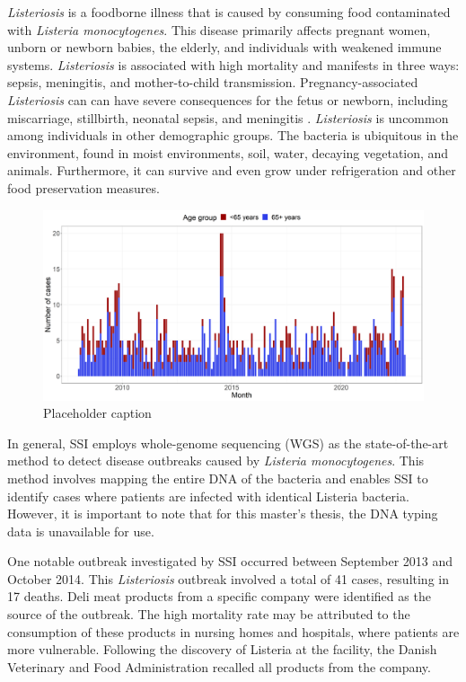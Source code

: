 \documentclass[a4paper,twoside,11pt]{report} %
\theoremstyle{definition}
\theoremstyle{definition}
\theoremstyle{definition}
\theoremstyle{definition}
\theoremstyle{remark}
\begin{document}
\textit{Listeriosis} is a foodborne illness that is caused by consuming food contaminated with \textit{Listeria monocytogenes}. This disease primarily affects pregnant women, unborn or newborn babies, the elderly, and individuals with weakened immune systems. \textit{Listeriosis} is associated with high mortality \autocite{Goulet_2012} and manifests in three ways: sepsis, meningitis, and mother-to-child transmission. Pregnancy-associated \textit{Listeriosis} can can have severe consequences for the fetus or newborn, including miscarriage, stillbirth, neonatal sepsis, and meningitis \autocite{Awofisayo_2015}. \textit{Listeriosis} is uncommon among individuals in other demographic groups. The bacteria is ubiquitous in the environment, found in moist environments, soil, water, decaying vegetation, and animals. Furthermore, it can survive and even grow under refrigeration and other food preservation measures.



\begin{figure}[H]
\includegraphics[width=1\linewidth]{../figures/LIST_long_plot} \caption{Placeholder caption}\label{fig:LISTLongPlot}
\end{figure}

In general, SSI employs whole-genome sequencing (WGS) as the state-of-the-art method to detect disease outbreaks caused by \textit{Listeria monocytogenes}. This method involves mapping the entire DNA of the bacteria and enables SSI to identify cases where patients are infected with identical Listeria bacteria. However, it is important to note that for this master's thesis, the DNA typing data is unavailable for use.

One notable outbreak investigated by SSI occurred between September 2013 and October 2014. This \textit{Listeriosis} outbreak involved a total of 41 cases, resulting in 17 deaths. Deli meat products from a specific company were identified as the source of the outbreak. The high mortality rate may be attributed to the consumption of these products in nursing homes and hospitals, where patients are more vulnerable. Following the discovery of Listeria at the facility, the Danish Veterinary and Food Administration recalled all products from the company.
\end{document}
